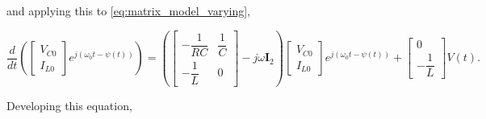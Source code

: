 \begin{example}
	\noindent and applying this to \eqref{eq:matrix_model_varying},

\begin{equation} \dfrac{d}{dt} \left(\left[ \begin{array}{l} V_{C0} \\[3mm] I_{L0} \end{array}\right]e^{j\left(\omega_0 t - \psi(t)\right)}\right) = \left(\left[\begin{array}{cc} -\dfrac{1}{RC} & \dfrac{1}{C} \\[5mm] - \dfrac{1}{L} & 0 \end{array}\right] - j\omega \mathbf{I}_2\right) \left[ \begin{array}{l} V_{C0} \\[3mm] I_{L0} \end{array}\right]e^{j\left(\omega_0 t - \psi(t)\right)} + \left[\begin{array}{c} 0 \\[3mm] -\dfrac{1}{L}\end{array}\right] V(t) . \label{eq:matrix_model_varying_1}\end{equation}

	Developing this equation,


\end{example}

